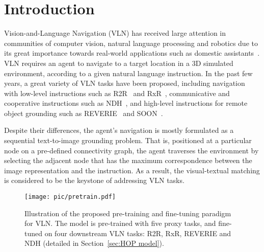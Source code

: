 \documentclass[10pt,twocolumn,letterpaper]{article}
\begin{document}
\section{Introduction}
\label{sec:intro}
\vspace{-5pt}
Vision-and-Language Navigation (VLN) has received large attention in communities of computer vision, natural language processing and robotics due to its great importance towards real-world applications such as domestic assistants~\cite{r2r,rcm, speakerfollower,touchdown,hanna,vlnce,VisionBase_imi}.
VLN requires an agent to navigate to a target location in a 3D simulated environment, according to a given natural language instruction. 
In the past few years, a great variety of VLN tasks have been proposed, including navigation with low-level instructions such as R2R~\cite{r2r} and RxR~\cite{rxr}, communicative and cooperative instructions such as NDH~\cite{ndh}, and high-level instructions for remote object grounding such as REVERIE~\cite{reverie} and SOON~\cite{soon}.


Despite their differences, the agent's navigation is mostly formulated as a sequential text-to-image grounding problem.
That is, positioned at a particular node on a pre-defined connectivity graph, the agent traverses the environment by selecting the adjacent node that has the maximum correspondence between the image representation and the instruction. 
As a result, the visual-textual matching is considered to be the keystone of addressing VLN tasks.

\begin{figure}[!t]
	\begin{center}
		\texttt{[image: pic/pretrain.pdf]}
	\end{center}
	\vspace{-17pt}
	\caption{{Illustration of the proposed pre-training and ﬁne-tuning paradigm for VLN. The model is pre-trained with five proxy tasks, and fine-tuned on four downstream VLN tasks: R2R, RxR, REVERIE and NDH (detailed in Section~\ref{sec:HOP model})}.
	}
	\label{fig:pretrain}
	\vspace{-17pt}
\end{figure}
\end{document}
